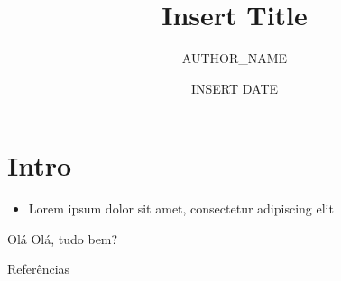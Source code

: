 \documentclass[11pt]{beamer}
\title[title]{Insert Title}
\author[author]
{AUTHOR_NAME}
\date{INSERT DATE}
\begin{document}
\begin{frame}
    \titlepage 
\end{frame}



\section{Intro} 
\begin{frame}{1}
\begin{itemize}
\item Lorem ipsum dolor sit amet, consectetur adipiscing elit
\end{itemize}
\end{frame}

\begin{frame}{Olá}
    Olá, tudo bem?
\end{frame}

\nocite{*}
\begin{frame}[allowframebreaks]{Referências}


\end{frame}
\end{document}
